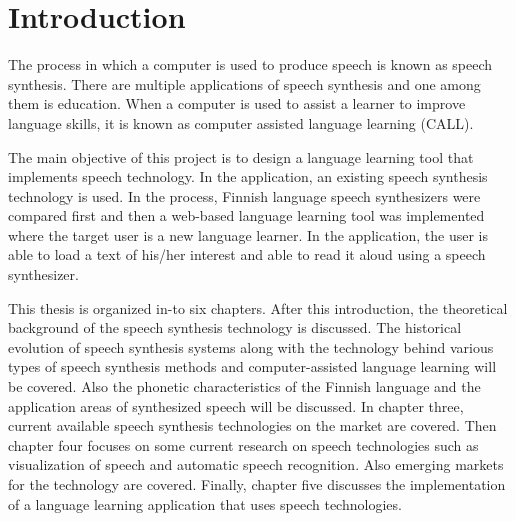 \documentclass[11pt,a4paper,oneside,article]{memoir}
\begin{document}
\pagestyle{plain}

\setcounter{page}{1} %
\ClearWallPaper

\chapter{Introduction}


The process in which a computer is used to produce speech is known as speech synthesis. There are multiple applications of speech synthesis and one among them is education. When a computer is used to assist a learner to improve language skills, it is known as computer assisted language learning (CALL). 
	
The main objective of this project is to design a language learning tool that implements speech technology. In the application, an existing speech synthesis technology is used. In the process, Finnish language speech synthesizers were compared first and then a web-based language learning tool was implemented where the target user is a new language learner. In the application, the user is able to load a text of his/her interest and able to read it aloud using a speech synthesizer.	

This thesis is organized in-to six chapters. After this introduction, the theoretical background of the speech synthesis technology is discussed. The historical evolution of speech synthesis systems along with the technology behind various types of speech synthesis methods and computer-assisted language learning will be covered. Also the phonetic characteristics of the Finnish language and the application areas of synthesized speech will be discussed. In chapter three, current available speech synthesis technologies on the market are covered. Then chapter four focuses on some current research on speech technologies such as visualization of speech and automatic speech recognition. Also emerging markets for the technology are covered. Finally, chapter five discusses the implementation of a language learning application that uses speech technologies.
\end{document}
